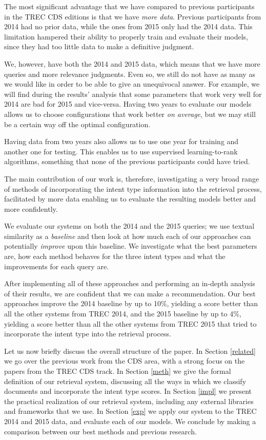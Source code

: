 The most significant advantage that we have compared to previous participants in the TREC CDS editions is 
that we have \emph{more data}. Previous participants from 2014 had no prior data, while the ones from 2015
only had the 2014 data. This limitation hampered their ability to properly train and evaluate their models, since they
had too little data to make a definitive judgment. 

We, however, have both the 2014 and 2015 data, which means that
we have more queries and more relevance judgments.
Even so, we still do not have as many as we would like in order to be able to give an unequivocal answer.
For example, we will find during the results' analysis
that some parameters that work very well for 2014 are bad for 2015 and vice-versa. Having two
years to evaluate our models allows us to choose configurations that work better \emph{on average}, but we
may still be a certain way off the optimal configuration.

Having data from two years also allows us to use one year for training and another one for testing.
This enables us to use supervised learning-to-rank algorithms,
something that none of the previous participants could have tried.

The main contribution of our work is, therefore, investigating a very broad range of methods of incorporating
the intent type information into the retrieval process, 
facilitated by more data enabling us to evaluate the resulting models better and more confidently.

We evaluate our systems on both the 2014 and the 2015 queries; we use textual similarity
as a \emph{baseline} and then look at how much each of our approaches can potentially \emph{improve} upon this baseline.
We investigate what the best parameters are, how each method behaves for the three
intent types and what the improvements for each query are.

After implementing all of these approaches and performing an in-depth analysis of their results,
we are confident that we can make a recommendation.
Our best approaches improve the 2014 baseline by up to 10\%, yielding a score better than all the other systems from TREC 2014,
and the 2015 baseline by up to 4\%, yielding a score better than all the other systems from TREC 2015 that tried to incorporate the intent
type into the retrieval process.

Let us now briefly discuss the overall structure of the paper. In Section \ref{related} we go over the previous work
from the CDS area, with a strong focus on the papers from the TREC CDS track. 
In Section \ref{meth} we give the formal definition of our retrieval system, discussing all the ways in which we classify documents
and incorporate the intent type scores. 
In Section \ref{impl} we present the practical realization of our retrieval system, including any external libraries
and frameworks that we use.
In Section \ref{exp} we apply our system to the TREC 2014 and 2015 data, and evaluate each of our models.
We conclude by making a comparison between our best methods and previous research.







